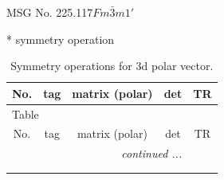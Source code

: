 \documentclass[fleqn,8pt]{jsarticle}
\begin{document}
\setcounter{MaxMatrixCols}{32}

\renewcommand{\tablename}{Table~}
\renewcommand{\figurename}{Figure~}
\begin{center}
\LARGE
MSG No. 225.117\quad$Fm\bar{3}m1'$
\end{center}
* symmetry operation
\renewcommand{\arraystretch}{1.3}
\begin{longtable}{ccccc}
\caption{Symmetry operations for 3d polar vector.}
 \\
 \hline \hline
No. & tag & matrix (polar) & det & TR \\ \hline \endfirsthead

\multicolumn{4}{l}{\tablename\ \thetable{}} \\
 \hline \hline
No. & tag & matrix (polar) & det & TR \\ \hline \endhead

 \hline \hline
\multicolumn{4}{r}{\footnotesize\it continued ...} \\ \endfoot

 \hline \hline
\multicolumn{4}{r}{} \\ \endlastfoot


\end{longtable}
\end{document}
